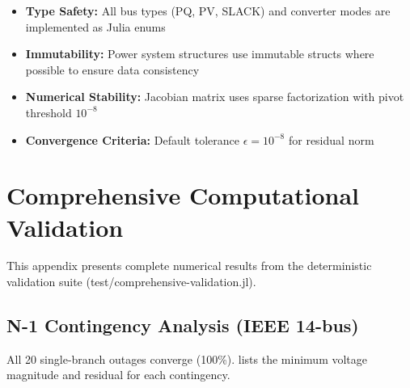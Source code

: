 \documentclass[11pt]{article}
\def\file#1{#1}%
\def\_{-}%
\newcommand{\file}[1]{\path{#1}}
\begin{document}
\begin{itemize}
    \item \textbf{Type Safety:} All bus types (PQ, PV, SLACK) and converter modes are implemented as Julia enums
    \item \textbf{Immutability:} Power system structures use immutable structs where possible to ensure data consistency
    \item \textbf{Numerical Stability:} Jacobian matrix uses sparse factorization with pivot threshold $10^{-8}$
    \item \textbf{Convergence Criteria:} Default tolerance $\epsilon = 10^{-8}$ for residual norm
\end{itemize}

\section{Comprehensive Computational Validation}\label{app:validation}

This appendix presents complete numerical results from the deterministic validation suite (\file{test/comprehensive\_validation.jl}).

\subsection{N-1 Contingency Analysis (IEEE 14-bus)}

All 20 single-branch outages converge (100\%).   lists the
minimum voltage magnitude and residual for each contingency.
\end{document}
